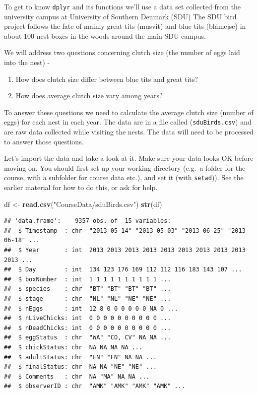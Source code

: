 \documentclass[
  a4paperpaper,
]{book}
\newenvironment{Shaded}{\begin{snugshade}}{\end{snugshade}}
\newcommand{\KeywordTok}[1]{\textcolor[rgb]{0.13,0.29,0.53}{\textbf{#1}}}
\newcommand{\NormalTok}[1]{#1}
\newcommand{\StringTok}[1]{\textcolor[rgb]{0.31,0.60,0.02}{#1}}
\providecommand{\tightlist}{%
  \setlength{\itemsep}{0pt}\setlength{\parskip}{0pt}}
\begin{document}
To get to know \texttt{dplyr} and its functions we'll use a data set
collected from the university campus at University of Southern Denmark (SDU) The SDU bird project follows the fate of mainly great tits (musvit) and blue tits (blåmejse) in about 100 nest boxes in the woods around the main SDU campus.

We will address two questions concerning clutch size (the number of eggs laid into the nest) -

\begin{enumerate}
\def\labelenumi{\arabic{enumi}.}
\tightlist
\item
  How does clutch size differ between blue tits and great tits?
\item
  How does average clutch size vary among years?
\end{enumerate}

To answer these questions we need to calculate the average clutch size (number of eggs) for each nest in each year. The data are in a file called (\texttt{sduBirds.csv}) and are raw data collected while visiting the nests. The data will need to be processed to answer those questions.

Let's import the data and take a look at it. Make sure your data looks OK before moving on.
You should first set up your working directory (e.g.~a folder for the course, with a subfolder for course data etc.), and set it (with \texttt{setwd})).
See the earlier material for how to do this, or ask for help.

\begin{Shaded}
\begin{Highlighting}[]
\NormalTok{df \textless{}{-}}\StringTok{ }\KeywordTok{read.csv}\NormalTok{(}\StringTok{"CourseData/sduBirds.csv"}\NormalTok{)}
\KeywordTok{str}\NormalTok{(df)}
\end{Highlighting}
\end{Shaded}

\begin{verbatim}
## 'data.frame':	9357 obs. of  15 variables:
##  $ Timestamp  : chr  "2013-05-14" "2013-05-03" "2013-06-25" "2013-06-18" ...
##  $ Year       : int  2013 2013 2013 2013 2013 2013 2013 2013 2013 2013 ...
##  $ Day        : int  134 123 176 169 112 112 116 183 143 107 ...
##  $ boxNumber  : int  1 1 1 1 1 1 1 1 1 1 ...
##  $ species    : chr  "BT" "BT" "BT" "BT" ...
##  $ stage      : chr  "NL" "NL" "NE" "NE" ...
##  $ nEggs      : int  12 8 0 0 0 0 0 0 NA 0 ...
##  $ nLiveChicks: int  0 0 0 0 0 0 0 0 0 0 ...
##  $ nDeadChicks: int  0 0 0 0 0 0 0 0 0 0 ...
##  $ eggStatus  : chr  "WA" "CO, CV" NA NA ...
##  $ chickStatus: chr  NA NA NA NA ...
##  $ adultStatus: chr  "FN" "FN" NA NA ...
##  $ finalStatus: chr  NA NA "NE" "NE" ...
##  $ Comments   : chr  NA "MA" NA NA ...
##  $ observerID : chr  "AMK" "AMK" "AMK" "AMK" ...
\end{verbatim}
\end{document}
